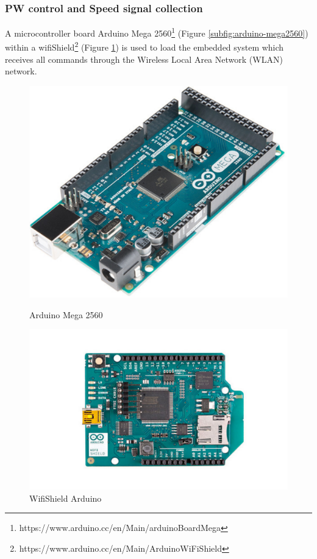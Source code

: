\subsubsection{PW control and Speed signal collection }

A microcontroller board Arduino Mega 2560\footnote{https://www.arduino.cc/en/Main/arduinoBoardMega} (Figure \ref{subfig:arduino-mega2560})  within a wifiShield\footnote{https://www.arduino.cc/en/Main/ArduinoWiFiShield} (Figure \ref{subfig:arduino-wifishield}) is used to load the embedded system which receives all commands through the Wireless Local Area Network  (WLAN) network. 

\begin{figure}[!htbp]
\center
\begin{minipage}{0.4\linewidth}
\center
\captionsetup{justification=centering,margin=0.5cm,font=small}
\includegraphics[width=0.87 \linewidth]{img/cap4/arduino-mega2560}
\caption{Arduino Mega 2560} \label{subfig:arduino-mega2560}
\end{minipage}
\begin{minipage}{0.4\linewidth}
\center
\captionsetup{justification=centering,margin=0cm,font=small}
\includegraphics[width=1.15\linewidth]{img/cap4/arduino-wifishield}
\caption{WifiShield Arduino} \label{subfig:arduino-wifishield}
\end{minipage}
\end{figure}

